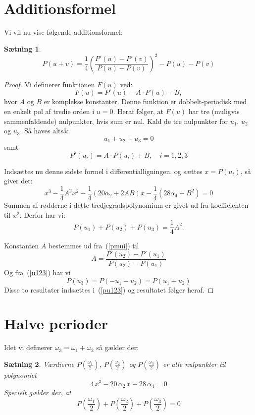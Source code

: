 \documentclass[12pt,oneside,a4paper]{article}
\newcommand{\be}{\begin{equation}}
\newcommand{\ee}{\end{equation}}
\newtheorem{thm}{Sætning}[section]
\begin{document}
\section{Additionsformel}
Vi vil nu vise følgende additionsformel:
\begin{thm}
    \be
    P(u+v) = \frac{1}{4} \left(\frac{P'(u)-P'(v)}{P(u)-P(v)}\right)^2 - P(u) - P(v)
    \ee
\end{thm}
\begin{proof}
    Vi definerer funktionen $F(u)$ ved:
    \be
    F(u) = P'(u) - A\cdot P(u) - B,
    \ee
    hvor $A$ og $B$ er komplekse konstanter.
    Denne funktion er dobbelt-periodisk med en enkelt pol af tredie orden i $u=0$. Heraf følger, at $F(u)$ har tre (muligvis sammenfaldende) nulpunkter, hvis sum er nul. Kald de tre nulpunkter for $u_1$, $u_2$ og $u_3$. Så haves altså:
    $$
    u_1 + u_2 + u_3 = 0
    \label{u123}
    $$
    samt
    \be
    P'(u_i) = A\cdot P(u_i) + B, \quad i=1,2,3
    \label{pmui}
    \ee

    Indsættes nu denne sidste formel i differentialligningen, og sættes $x=P(u_i)$, så giver det:
    $$
    x^3 - \frac 14 A^2 x^2 - \frac 14 (20 \alpha_2 + 2AB) x - \frac 14 (28\alpha_4 + B^2) = 0
    $$
    Summen af rødderne i dette tredjegradspolynomium er givet ud fra koefficienten til $x^2$. Derfor har vi:
    \be
    P(u_1) + P(u_2) + P(u_3) = \frac 14 A^2.
    \label{pu123}
    \ee

    Konstanten $A$ bestemmes ud fra~(\ref{pmui}) til
    $$
    A = \frac{P'(u_2)-P'(u_1)}{P(u_2)-P(u_1)}
    $$
    Og fra~(\ref{u123}) har vi
    $$
    P(u_3) = P(-u_1-u_2) = P(u_1+u_2)
    $$
    Disse to resultater indsættes i~(\ref{pu123}) og resultatet følger heraf.
\end{proof}

\section{Halve perioder}
Idet vi definerer $\omega_3 = \omega_1 + \omega_2$ så gælder der:
\begin{thm}
    Værdierne $P(\frac{\omega_1}{2})$, $P(\frac{\omega_2}{2})$ og $P(\frac{\omega_3}{2})$
    er alle nulpunkter til polynomiet
    $$
    4\,x^3 - 20\,\alpha_2 \,x - 28 \,\alpha_4 = 0
    $$
    Specielt gælder der, at 
    $$
    P\left(\frac{\omega_1}{2}\right) + P\left(\frac{\omega_2}{2}\right) + P\left(\frac{\omega_3}{2}\right) = 0
    $$
\end{thm}
\end{document}
